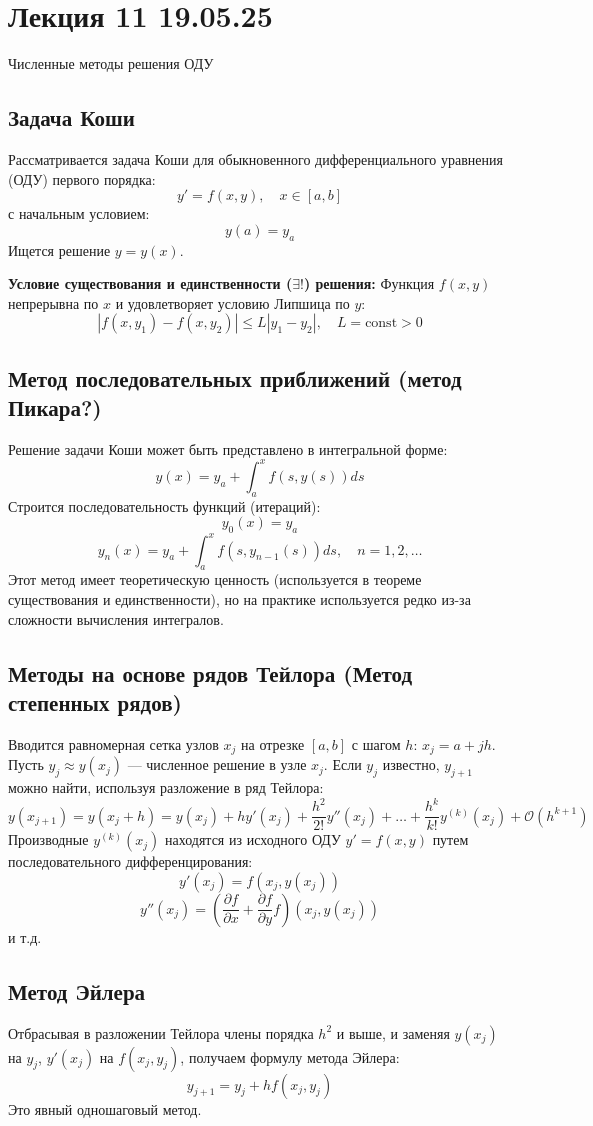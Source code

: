 \section{Лекция 11 19.05.25}

Численные методы решения ОДУ

\subsection{Задача Коши}
Рассматривается задача Коши для обыкновенного дифференциального уравнения (ОДУ) первого порядка:
\[ y' = f(x, y), \quad x \in [a, b] \]
с начальным условием:
\[ y(a) = y_a \]
Ищется решение $y = y(x)$.

\textbf{Условие существования и единственности ($\exists!$) решения:}
Функция $f(x,y)$ непрерывна по $x$ и удовлетворяет условию Липшица по $y$:
\[ |f(x, y_1) - f(x, y_2)| \le L |y_1 - y_2|, \quad L = \text{const} > 0 \]

\subsection{Метод последовательных приближений (метод Пикара?)}
Решение задачи Коши может быть представлено в интегральной форме:
\[ y(x) = y_a + \int_a^x f(s, y(s)) ds\]
Строится последовательность функций (итераций):
\[ y_0(x) = y_a \]
\[ y_n(x) = y_a + \int_a^x f(s, y_{n-1}(s)) ds, \quad n=1, 2, \dots \]
Этот метод имеет теоретическую ценность (используется в теореме существования и единственности), но на практике используется редко из-за сложности вычисления интегралов.

\subsection{Методы на основе рядов Тейлора (Метод степенных рядов)}
Вводится равномерная сетка узлов $x_j$ на отрезке $[a,b]$ с шагом $h$: $x_j = a+jh$.
Пусть $y_j \approx y(x_j)$ --- численное решение в узле $x_j$.
Если $y_j$ известно, $y_{j+1}$ можно найти, используя разложение в ряд Тейлора:
\[ y(x_{j+1}) = y(x_j + h) = y(x_j) + h y'(x_j) + \frac{h^2}{2!} y''(x_j) + \dots + \frac{h^{k}}{k!} y^{(k)}(x_j) + \mathcal{O}(h^{k+1}) \]
Производные $y^{(k)}(x_j)$ находятся из исходного ОДУ $y' = f(x,y)$ путем последовательного дифференцирования:
\[ y'(x_j) = f(x_j, y(x_j)) \]
\[ y''(x_j) = \left( \frac{\partial f}{\partial x} + \frac{\partial f}{\partial y} f \right)(x_j, y(x_j)) \]
и т.д.

\subsection{Метод Эйлера}
Отбрасывая в разложении Тейлора члены порядка $h^2$ и выше, и заменяя $y(x_j)$ на $y_j$, $y'(x_j)$ на $f(x_j, y_j)$, получаем формулу метода Эйлера:
\[ y_{j+1} = y_j + h f(x_j, y_j) \]
Это явный одношаговый метод.


